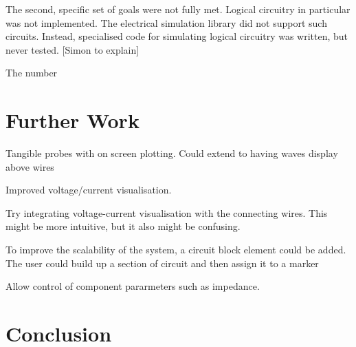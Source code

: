 The second, specific set of goals were not fully met. Logical circuitry in particular was not implemented. The electrical simulation library did not support such circuits. Instead, specialised code for simulating logical circuitry was written, but never tested. [Simon to explain]

The number 

\section{Further Work}
Tangible probes with on screen plotting. Could extend to having waves display above wires

Improved voltage/current visualisation.

Try integrating voltage-current visualisation with the connecting wires. This might be more intuitive, but it also might be confusing.

To improve the scalability of the system, a circuit block element could be added. The user could build up a section of circuit and then assign it to a marker 

Allow control of component pararmeters such as impedance.

\section{Conclusion}

